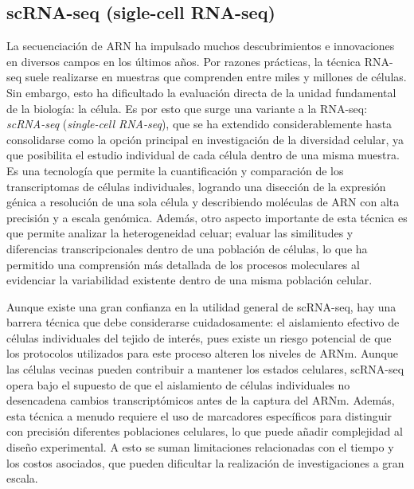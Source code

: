 \subsection{scRNA-seq (sigle-cell RNA-seq)}

La secuenciación de ARN ha impulsado muchos descubrimientos e innovaciones en diversos campos en los últimos años. Por razones prácticas, la técnica RNA-seq
suele realizarse en muestras que comprenden entre miles y millones de células. Sin embargo, esto ha dificultado la evaluación directa de la unidad fundamental
de la biología: la célula. Es por esto que surge una variante a la RNA-seq: \textit{scRNA-seq} (\textit{single-cell RNA-seq}), que se ha extendido considerablemente hasta 
consolidarse como la opción principal en investigación de la diversidad celular, ya que posibilita el estudio individual de cada célula dentro de una misma muestra. 
Es una tecnología que permite la cuantificación y comparación de los transcriptomas de células individuales, logrando una disección de la expresión génica a resolución de una 
sola célula y describiendo moléculas de ARN con alta precisión y a escala genómica. Además, otro aspecto importante de esta técnica es que permite analizar 
la heterogeneidad celuar; evaluar las similitudes y diferencias transcripcionales dentro de una población de células, lo que ha permitido una comprensión más 
detallada de los procesos moleculares al evidenciar la variabilidad existente dentro de una misma población celular. \newline

Aunque existe una gran confianza en la utilidad general de scRNA-seq, hay una barrera técnica que debe considerarse cuidadosamente: el aislamiento efectivo de 
células individuales del tejido de interés, pues existe un riesgo potencial de que los protocolos utilizados para este proceso alteren los niveles de ARNm. 
Aunque las células vecinas pueden contribuir a mantener los estados celulares, scRNA-seq opera bajo el supuesto de que el aislamiento de células individuales 
no desencadena cambios transcriptómicos antes de la captura del ARNm. Además, esta técnica a menudo requiere el uso de marcadores específicos para distinguir 
con precisión diferentes poblaciones celulares, lo que puede añadir complejidad al diseño experimental. A esto se suman limitaciones relacionadas con el tiempo 
y los costos asociados, que pueden dificultar la realización de investigaciones a gran escala. \newline


